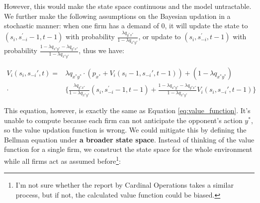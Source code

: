 \documentclass[12pt,letterpaper]{article}
\begin{document}
However, this would make the state space continuous and the model untractable. We further make the following assumptions on the Bayesian updation in a stochastic manner: when one firm has a demand of $0$, it will update the state to $(s_i,s_{-i}^\prime-1,t-1)$ with probability $\frac{\lambda q_{y^*x^*}}{1-\lambda q_{x^*y^*}}$, or update to $(s_i,s_{-i}^\prime,t-1)$ with probability $\frac{1-\lambda q_{x^*y^*}-\lambda q_{y^*x^*}}{1-\lambda q_{x^*y^*}}$, thus we have:

\[
    \begin{align}
        V_i(s_i,s_{-i}', t) = & \lambda q_{x^*y^*}\cdot(p_{x^*}+V_i(s_i-1,s_{-i}',t-1)) + (1-\lambda q_{x^*y^*}) \\
        \cdot & \{ \frac{\lambda q_{y^*x^*}}{1-\lambda q_{x^*y^*}} (s_i,s_{-i}^\prime-1,t-1) + \frac{1-\lambda q_{x^*y^*}-\lambda q_{y^*x^*}}{1-\lambda q_{x^*y^*}} V_i(s_i, s_{-i}', t-1)  \}
    \end{align}
\]

This equation, however, is exactly the same as Equation \ref{eq:value_function}. It's unable to compute because each firm can not anticipate the opponent's action $y^*$, so the value updation function is wrong. We could mitigate this by defining the Bellman equation under \textbf{a broader state space}. Instead of thinking of the value function for a single firm, we construct the state space for the whole environment while all firms act as assumed before\footnote{I'm not sure whether the report by Cardinal Operations takes a similar process, but if not, the calculated value function could be biased.}:
\end{document}
